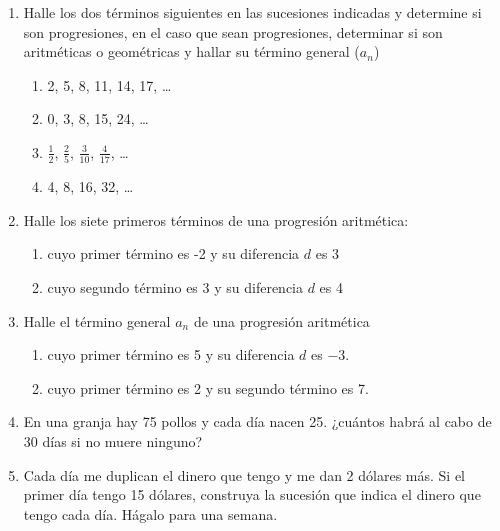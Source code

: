 \documentclass[11pt]{article}
\begin{document}
\begin{enumerate}
\item Halle los dos términos siguientes en las sucesiones indicadas y determine si son progresiones, en el caso que sean progresiones, determinar si son aritméticas o geométricas y hallar su término general ($a_{n}$)
\begin{enumerate}
\item 2, 5, 8, 11, 14, 17, \ldots \vspace*{40pt}
\item 0, 3, 8, 15, 24, \ldots\vspace*{40pt}
\item $\frac{1}{2}$, $\frac{2}{5}$, $\frac{3}{10}$, $\frac{4}{17}$, \ldots \vspace*{40pt}
\item 4, 8, 16, 32, \ldots \vspace*{40pt}
\end{enumerate}
\item Halle los siete primeros términos de una progresión aritmética:
\begin{enumerate}
\item cuyo primer término es -2 y su diferencia $d$ es 3\vspace*{30pt}
\item cuyo segundo término es 3 y su diferencia $d$ es 4\vspace*{30pt}
\end{enumerate}
\item Halle el término general $a_{n}$ de una progresión aritmética
\begin{enumerate}
\item cuyo primer término es 5 y su diferencia $d$ es $-3$.\vspace*{40pt}
\item cuyo primer término es 2 y su segundo término es 7.\vspace*{40pt}
\end{enumerate}
\item En una granja hay 75 pollos y cada día nacen 25. ¿cuántos habrá al cabo de 30 días si no muere ninguno?\vspace*{50pt}
\item Cada día me duplican el dinero que tengo y me dan 2 dólares más. Si el primer día tengo 15 dólares, construya la sucesión que indica el dinero que tengo cada día. Hágalo para una semana.
\end{enumerate}
\end{document}
